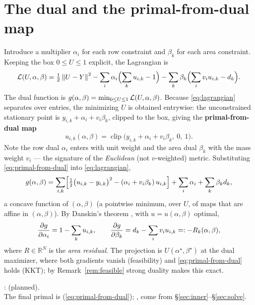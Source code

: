 \documentclass[11pt,a4paper]{article}
\begin{document}
\section{The dual and the primal-from-dual map}
\label{sec:dual}
Introduce a multiplier $\alpha_i$ for each row constraint and $\beta_k$ for each area
constraint. Keeping the box $0\le U\le1$ explicit, the Lagrangian is
\begin{equation}
  \mathcal{L}(U,\alpha,\beta)=\tfrac12\left\|U-Y\right\|^2
   -\sum_i\alpha_i\Bigl(\sum_k u_{i,k}-1\Bigr)
   -\sum_k\beta_k\Bigl(\sum_i v_i u_{i,k}-d_k\Bigr).
  \label{eq:lagrangian}
\end{equation}
The dual function is $g(\alpha,\beta)=\min_{0\le U\le1}\mathcal{L}(U,\alpha,\beta)$. Because
\eqref{eq:lagrangian} separates over entries, the minimizing $U$ is obtained entrywise: the
unconstrained stationary point is $y_{i,k}+\alpha_i+v_i\beta_k$, clipped to the box, giving
the \textbf{primal-from-dual map}
\begin{equation}
  u_{i,k}(\alpha,\beta)=\operatorname{clip}\!\bigl(y_{i,k}+\alpha_i+v_i\beta_k,\ 0,\ 1\bigr).
  \label{eq:primal-from-dual}
\end{equation}
Note the row dual $\alpha_i$ enters with unit weight and the area dual $\beta_k$ with the
mass weight $v_i$ --- the signature of the \emph{Euclidean} (not $v$-weighted) metric.
\label{sec:mechanism-note}
Substituting \eqref{eq:primal-from-dual} into \eqref{eq:lagrangian},
\begin{equation}
  g(\alpha,\beta)=\sum_{i,k}\Bigl[\tfrac12\bigl(u_{i,k}-y_{i,k}\bigr)^2
   -(\alpha_i+v_i\beta_k)\,u_{i,k}\Bigr]
   +\sum_i\alpha_i+\sum_k\beta_k d_k ,
  \label{eq:dualfun}
\end{equation}
a concave function of $(\alpha,\beta)$ (a pointwise minimum, over $U$, of maps that are
affine in $(\alpha,\beta)$). By Danskin's theorem \cite{bertsekas1999nonlinear}, with
$u=u(\alpha,\beta)$ optimal,
\begin{equation}
  \dfrac{\partial g}{\partial \alpha_i}=1-\sum_k u_{i,k},\qquad
  \dfrac{\partial g}{\partial \beta_k}=d_k-\sum_i v_i u_{i,k}=:-R_k(\alpha,\beta),
  \label{eq:dualgrad}
\end{equation}
where $R\in\mathbb{R}^N$ is the \emph{area residual}. The projection is $U(\alpha^\star,\beta^\star)$
at the dual maximizer, where both gradients vanish (feasibility) and \eqref{eq:primal-from-dual}
holds (KKT); by Remark~\ref{rem:feasible} strong duality makes this exact.

\begin{tcolorbox}[colback=blue!4!white, colframe=blue!40!black,
                  title={Code: primal reconstruction}, fontupper=\small]
:  (planned).\\[2pt]
The final primal is 
(\eqref{eq:primal-from-dual}); ,  come from \S\ref{sec:inner}--\S\ref{sec:solve}.
\end{tcolorbox}
\end{document}
